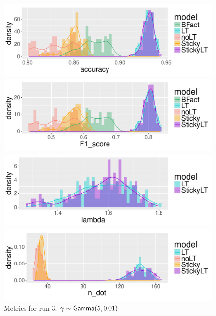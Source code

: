 \begin{figure}[tb]
  \centering
  \begin{minipage}{0.75\textwidth}
  \includegraphics[width = \textwidth]{fig/cocktail/synth_s16_m12/hyper_gamma/h10.0_nocs_cp0/a5b0p01/accuracy_density.pdf}
\end{minipage}

\begin{minipage}{0.75\textwidth}
  \includegraphics[width = \textwidth]{fig/cocktail/synth_s16_m12/hyper_gamma/h10.0_nocs_cp0/a5b0p01/F1_score_density.pdf}
\end{minipage}

\begin{minipage}{0.75\textwidth}
  \includegraphics[width = \textwidth]{fig/cocktail/synth_s16_m12/hyper_gamma/h10.0_nocs_cp0/a5b0p01/lambda_density.pdf}
\end{minipage}

\begin{minipage}{0.75\textwidth}
  \includegraphics[width = \textwidth]{fig/cocktail/synth_s16_m12/hyper_gamma/h10.0_nocs_cp0/a5b0p01/n_dot_density.pdf}
\end{minipage}
\caption{Metrics for run 3: $\gamma \sim \mathsf{Gamma}(5,0.01)$}
\end{figure}

